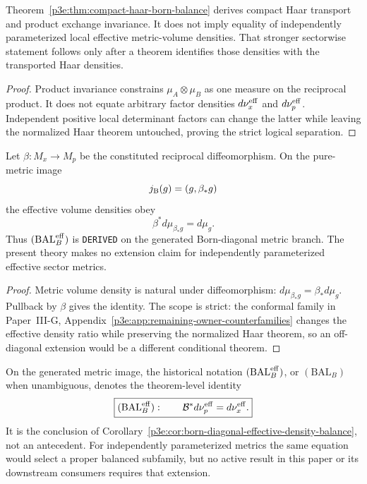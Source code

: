 \documentclass[12pt,a4paper]{article}
\begin{document}
\begin{corollary}
\label{p3e:cor:haar-effective-balance-firewall}
Theorem~\ref{p3e:thm:compact-haar-born-balance} derives compact Haar transport
and product exchange invariance.  It does not imply equality of independently
parameterized local effective metric-volume densities.  That stronger
sectorwise statement follows only after a theorem identifies those densities
with the transported Haar densities.
\end{corollary}

\begin{proof}
Product invariance constrains \(\mu_A\otimes\mu_B\) as one measure on the
reciprocal product.  It does not equate arbitrary factor densities
\(d\nu_x^{\rm eff}\) and \(d\nu_p^{\rm eff}\).  Independent positive local
determinant factors can change the latter while leaving the normalized Haar
theorem untouched, proving the strict logical separation.
\end{proof}

\begin{corollary}
\label{p3e:cor:born-diagonal-effective-density-balance}
Let \(\beta:M_x\to M_p\) be the constituted reciprocal diffeomorphism.  On
the pure-metric image
\[
             j_{\rm B}(g)=(g,\beta_*g)
\]
the effective volume densities obey
\[
             \boxed{\beta^*d\mu_{\beta_*g}=d\mu_g.}
\]
Thus \((\mathrm{BAL}_B^{\rm eff})\) is \texttt{DERIVED} on the generated
Born-diagonal metric branch.  The present theory makes no extension claim for
independently parameterized effective sector metrics.
\end{corollary}

\begin{proof}
Metric volume density is natural under diffeomorphism:
\(d\mu_{\beta_*g}=\beta_*d\mu_g\).  Pullback by \(\beta\) gives the
identity.  The scope is strict: the conformal family in
Paper~III-G, Appendix~\ref{p3e:app:remaining-owner-counterfamilies} changes the effective
density ratio while preserving the normalized Haar theorem, so an
off-diagonal extension would be a different conditional theorem.
\end{proof}

\begin{remark}
\label{p3e:def:born-measure-balance-interface}
On the generated metric image, the historical notation
\((\mathrm{BAL}_B^{\rm eff})\), or \((\mathrm{BAL}_B)\) when unambiguous,
denotes the theorem-level identity
\[
 \boxed{(\mathrm{BAL}_B^{\rm eff}):\qquad
 \mathcal B^*d\nu_p^{\rm eff}=d\nu_x^{\rm eff}.}
\]
It is the conclusion of
Corollary~\ref{p3e:cor:born-diagonal-effective-density-balance}, not an
antecedent.  For independently parameterized metrics the same equation would
select a proper balanced subfamily, but no active result in this paper or its
downstream consumers requires that extension.
\end{remark}
\end{document}
